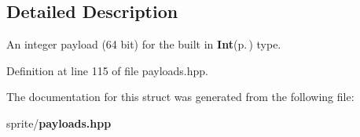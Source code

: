 \subsection{Detailed Description}
An integer payload (64 bit) for the built in {\bf Int}{\rm (p.\,\pageref{structsprite_1_1payloads_1_1Int})} type. 



Definition at line 115 of file payloads.hpp.

The documentation for this struct was generated from the following file:\begin{CompactItemize}
\item 
sprite/{\bf payloads.hpp}\end{CompactItemize}
